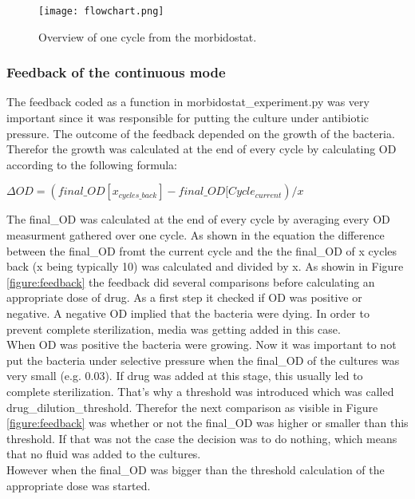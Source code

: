 \begin{figure}
	\texttt{[image: flowchart.png]}
	\caption{Overview of one cycle from the morbidostat.}
	\label{figure:flowchart}	
\end{figure}

\subsubsection{Feedback of the continuous mode} 
The feedback coded as a function in morbidostat\_experiment.py was very important since it was responsible for putting the culture under antibiotic pressure. The outcome of the feedback depended on the growth of the bacteria. Therefor the growth was calculated at the end of every cycle by calculating \textDelta OD according to the following formula:
\begin{center}
	$\Delta OD = (final\_OD[x_{cycles\_back}] - final\_OD[Cycle_{current})/x$
\end{center}
The final\_OD was calculated at the end of every cycle by averaging every OD measurment gathered over one cycle. As shown in the equation the difference between the final\_OD fromt the current cycle and the the final\_OD of x cycles back (x being typically 10) was calculated and divided by x.
As showin in Figure \ref{figure:feedback} the feedback did several comparisons before calculating an appropriate dose of drug. As a first step it checked if \textDelta OD was positive or negative. A negative \textDelta OD implied that the bacteria were dying. In order to prevent complete sterilization, media was getting added in this case. \\
When \textDelta OD was positive the bacteria were growing. Now it was important to not put the bacteria under selective pressure when the final\_OD of the cultures was very small (e.g. 0.03). If drug was added at this stage, this usually led to complete sterilization. That's why a threshold was introduced which was called drug\_dilution\_threshold. Therefor the next comparison as visible in Figure \ref{figure:feedback} was whether or not the final\_OD was higher or smaller than this threshold. If that was not the case the decision was to do nothing, which means that no fluid was added to the cultures. \\
However when the final\_OD was bigger than the threshold calculation of the appropriate dose was started.
